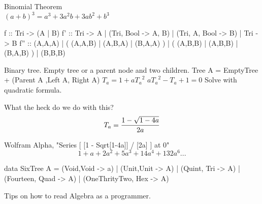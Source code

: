 \documentclass{beamer}
\begin{document}
\begin{frame}[fragile]
Binomial Theorem\\
$(a+b)^{3} = a^{3} + 3a^{2}b + 3ab^{2} + b^{3}$

\begin{code}
f :: Tri -> (A | B)
f' ::  Tri -> A  
       | (Tri, Bool -> A, B)  
       | (Tri, A, Bool -> B)
       | Tri -> B
f'' :: (A,A,A) 
       | ( (A,A,B) | (A,B,A) | (B,A,A) )
       | ( (A,B,B) | (A,B,B) | (B,A,B) )
       | (B,B,B)
\end{code}

\end{frame}

\begin{frame}
Binary tree.\newline\newline
Empty tree or a parent node and two children. \newline\newline
Tree  A = EmptyTree + (Parent A ,Left A, Right  A)\newline\newline
$T_{a} = 1+a{T_{a}}^{2} $\newline\newline
$a{T_{a}}^{2 } - T_{a}+ 1  = 0$\newline\newline
Solve with quadratic formula.\newline\newline
\end{frame}

\begin{frame}[fragile]
What the heck do we do with this? %
$$T_{a} = {1 - \sqrt {1 - 4a} \over 2a}$$

Wolfram Alpha, "Series [ [1 - Sqrt[1-4a]] / [2a] ] at 0"
$$1+a+2a^{2}+5a^{3} + 14a^{4} + 132a^{6}...$$
\begin{code}
data SixTree A = (Void,Void -> a)  | (Unit,Unit -> A) 
   | (Quint, Tri -> A) | (Fourteen, Quad -> A)
   | (OneThrityTwo, Hex -> A) 
\end{code}
\end{frame}

\begin{frame}[fragile]
Tips on how to read Algebra as a programmer.
\end{frame}
\end{document}
